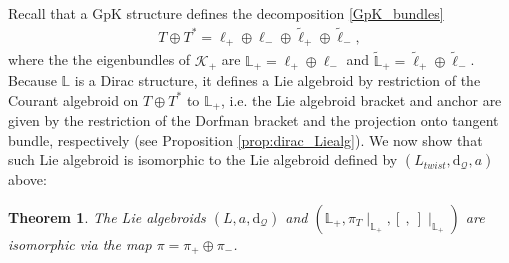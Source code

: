 \documentclass{article}
\newcommand{\TT}{{T\oplus T^*}}
\newcommand{\KK}{\mathcal{K}}
\newcommand{\QQ}{\mathcal{Q}}
\newcommand{\rd}{\mathrm{d}}
\newcommand{\Lb}{\mathbb{L}}
\newcommand{\ellt}{{\tl{\ell}}}
\newcommand{\brac}{[\ ,\ ]}
\newcommand{\wtl}{\widetilde}
\def\tl{\tilde}
\newtheorem{theorem}{Theorem}[section]
\theoremstyle{definition}
\theoremstyle{remark}
\begin{document}
Recall that a GpK structure defines the decomposition \eqref{GpK_bundles}
\begin{align*}
\TT=\ell_+\oplus\ell_-\oplus \ellt_+\oplus \ellt_-,
\end{align*}
where the the eigenbundles of $\KK_+$ are $\Lb_+=\ell_+\oplus\ell_-$ and $\wtl{\Lb}_+=\ellt_+\oplus \ellt_-$. Because $\Lb$ is a Dirac structure, it defines a Lie algebroid by restriction of the Courant algebroid on $\TT$ to $\Lb_+$, i.e. the Lie algebroid bracket and anchor are given by the restriction of the Dorfman bracket and the projection onto tangent bundle, respectively (see Proposition \ref{prop:dirac_Liealg}). We now show that such Lie algebroid is isomorphic to the Lie algebroid defined by $(L_{twist},\rd_\QQ,a)$ above:
\begin{theorem}
The Lie algebroids $(L,a,\rd_\QQ)$ and $(\Lb_+,\pi_T\!\!\mid_{\Lb_+},\brac\!\!\mid_{\Lb_+})$ are isomorphic via the map $\pi=\pi_+\oplus \pi_-$.
\end{theorem}
\end{document}
